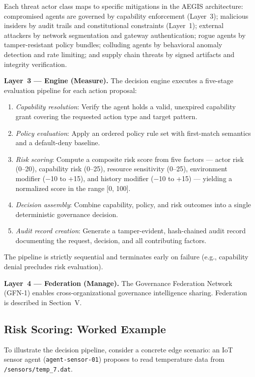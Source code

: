 \documentclass[journal]{IEEEtran}
\begin{document}
Each threat actor class maps to specific mitigations in the AEGIS architecture: compromised agents are governed by capability enforcement (Layer~3); malicious insiders by audit trails and constitutional constraints (Layer~1); external attackers by network segmentation and gateway authentication; rogue agents by tamper-resistant policy bundles; colluding agents by behavioral anomaly detection and rate limiting; and supply chain threats by signed artifacts and integrity verification.

\textbf{Layer~3 --- Engine (Measure).} The decision engine executes a five-stage evaluation pipeline for each action proposal:

\begin{enumerate}
\item \textit{Capability resolution}: Verify the agent holds a valid, unexpired capability grant covering the requested action type and target pattern.
\item \textit{Policy evaluation}: Apply an ordered policy rule set with first-match semantics and a default-deny baseline.
\item \textit{Risk scoring}: Compute a composite risk score from five factors --- actor risk (0--20), capability risk (0--25), resource sensitivity (0--25), environment modifier ($-$10 to +15), and history modifier ($-$10 to +15) --- yielding a normalized score in the range [0, 100].
\item \textit{Decision assembly}: Combine capability, policy, and risk outcomes into a single deterministic governance decision.
\item \textit{Audit record creation}: Generate a tamper-evident, hash-chained audit record documenting the request, decision, and all contributing factors.
\end{enumerate}

The pipeline is strictly sequential and terminates early on failure (e.g., capability denial precludes risk evaluation).

\textbf{Layer~4 --- Federation (Manage).} The Governance Federation Network (GFN-1) enables cross-organizational governance intelligence sharing. Federation is described in Section~V.

\subsection{Risk Scoring: Worked Example}

To illustrate the decision pipeline, consider a concrete edge scenario: an IoT sensor agent (\texttt{agent-sensor-01}) proposes to read temperature data from \texttt{/sensors/temp\_7.dat}.
\end{document}
